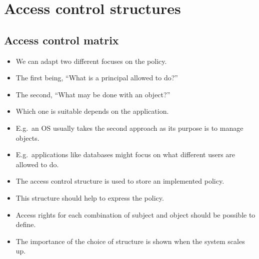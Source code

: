 \mode*




\section{Access control structures}

\subsection{Access control matrix}

\begin{frame}
  \begin{itemize}
    \item We can adapt two different focuses on the policy.

    \item The first being, ``What is a principal allowed to do?''

    \item The second, ``What may be done with an object?''

      \pause{}

    \item Which one is suitable depends on the application.

    \item E.g.\ an OS usually takes the second approach as its purpose is to 
      manage objects.

    \item E.g.\ applications like databases might focus on what different users 
      are allowed to do.
  \end{itemize}
\end{frame}

\begin{frame}
  \begin{itemize}
    \item The access control structure is used to store an implemented policy.

    \item This structure should help to express the policy.

    \item Access rights for each combination of subject and object should be 
      possible to define.

    \item The importance of the choice of structure is shown when the system 
      scales up.

  \end{itemize}
\end{frame}

